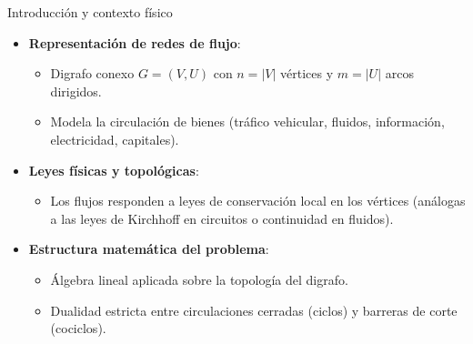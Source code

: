 \documentclass[
  ignorenonframetext,
]{beamer}
\providecommand{\tightlist}{%
  \setlength{\itemsep}{0pt}\setlength{\parskip}{0pt}}
\begin{document}
\begin{frame}{Introducción y contexto físico}
\label{introducciuxf3n-y-contexto-fuxedsico}
\begin{itemize}
\tightlist
\item
  \textbf{Representación de redes de flujo}:

  \begin{itemize}
  \tightlist
  \item
    Digrafo conexo \(G = (V, U)\) con \(n = |V|\) vértices y \(m = |U|\)
    arcos dirigidos.
  \item
    Modela la circulación de bienes (tráfico vehicular, fluidos,
    información, electricidad, capitales).
  \end{itemize}
\item
  \textbf{Leyes físicas y topológicas}:

  \begin{itemize}
  \tightlist
  \item
    Los flujos responden a leyes de conservación local en los vértices
    (análogas a las leyes de Kirchhoff en circuitos o continuidad en
    fluidos).
  \end{itemize}
\item
  \textbf{Estructura matemática del problema}:

  \begin{itemize}
  \tightlist
  \item
    Álgebra lineal aplicada sobre la topología del digrafo.
  \item
    Dualidad estricta entre circulaciones cerradas (ciclos) y barreras
    de corte (cociclos).
  \end{itemize}
\end{itemize}
\end{frame}
\end{document}
